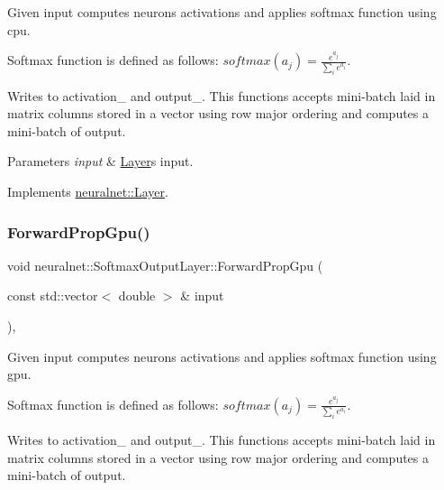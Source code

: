Given input computes neurons\textquotesingle{} activations and applies softmax function using cpu. 

Softmax function is defined as follows\+: $softmax(a_{j}) = \frac{e^{a_{j}}}{\sum_{i}e^{a_{i}}} $.

Writes to activation\+\_\+ and output\+\_\+. This functions accepts mini-\/batch laid in matrix columns stored in a vector using row major ordering and computes a mini-\/batch of output.


\begin{DoxyParams}{Parameters}
{\em input} & \hyperlink{classneuralnet_1_1Layer}{Layer}\textquotesingle{}s input. \\
\hline
\end{DoxyParams}


Implements \hyperlink{classneuralnet_1_1Layer_a3aa08517de6a73640cd0e511c134b231}{neuralnet\+::\+Layer}.

\mbox{\label{classneuralnet_1_1SoftmaxOutputLayer_acb4f6f8739a3dedde111f11b548899f7}} 
\subsubsection{\texorpdfstring{Forward\+Prop\+Gpu()}{ForwardPropGpu()}}
{\footnotesize\ttfamily void neuralnet\+::\+Softmax\+Output\+Layer\+::\+Forward\+Prop\+Gpu (\begin{DoxyParamCaption}\item[{const std\+::vector$<$ double $>$ \&}]{input }\end{DoxyParamCaption})\hspace{0.3cm}{\ttfamily [protected]}, {\ttfamily [virtual]}}



Given input computes neurons\textquotesingle{} activations and applies softmax function using gpu. 

Softmax function is defined as follows\+: $softmax(a_{j}) = \frac{e^{a_{j}}}{\sum_{i}e^{a_{i}}} $.

Writes to activation\+\_\+ and output\+\_\+. This functions accepts mini-\/batch laid in matrix columns stored in a vector using row major ordering and computes a mini-\/batch of output.


